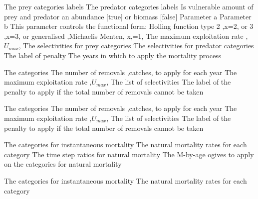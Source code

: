 \par\textbf{}\par
{} {The prey categories labels}
 {The predator categories labels}
 {Is vulnerable amount of prey and predator an abundance [true] or biomass [false]}
 {Parameter a}
 {Parameter b}
 {This parameter controls the functional form: Holling function type 2 ,x=2, or 3 ,x=3, or generalised ,Michaelis Menten, x,=1,}
 {The maximum exploitation rate ,$U_{max}$,}
 {The selectivities for prey categories}
 {The selectivities for predator categories}
 {The label of penalty}
 {The years in which to apply the mortality process}
\par\textbf{}\par
{} {The categories}
 {The number of removals ,catches, to apply for each year}
 {The maximum exploitation rate ,$U_{max}$,}
 {The list of selectivities}
 {The label of the penalty to apply if the total number of removals cannot be taken}
\par\textbf{}\par
{} {The categories}
 {The number of removals ,catches, to apply for each year}
 {The maximum exploitation rate ,$U_{max}$,}
 {The list of selectivities}
 {The label of the penalty to apply if the total number of removals cannot be taken}
\par\textbf{}\par
{} {The categories for instantaneous mortality}
 {The natural mortality rates for each category}
 {The time step ratios for natural mortality}
 {The M-by-age ogives to apply on the categories for natural mortality}
\par\textbf{}\par
{} {The categories for instantaneous mortality}
 {The natural mortality rates for each category}
